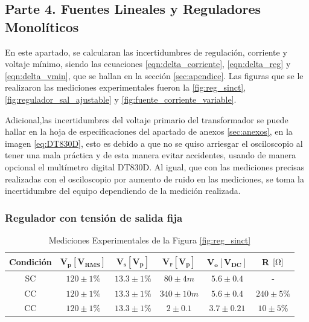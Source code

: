\subsection{Parte 4. Fuentes Lineales y Reguladores Monolíticos}\label{subsec:parte4}

    En este apartado, se calcularan las incertidumbres de regulación, corriente y voltaje mínimo, siendo las ecuaciones \ref{eqn:delta_corriente}, \ref{eqn:delta_reg} y \ref{eqn:delta_vmin}, que se hallan en la sección \ref{sec:apendice}. Las figuras que se le realizaron las mediciones experimentales fueron la \ref{fig:reg_sinct}, \ref{fig:regulador_sal_ajustable} y \ref{fig:fuente_corriente_variable}.

    Adicional,las incertidumbres del voltaje primario del transformador se puede hallar en la hoja de especificaciones del apartado de anexos \ref{sec:anexos}, en la imagen \ref{eq:DT830D}, esto es debido a que no se quiso arriesgar el osciloscopio al tener una mala práctica y de esta manera evitar accidentes, usando de manera opcional el multímetro digital DT830D. Al igual, que con las mediciones precisas realizadas con el osciloscopio por aumento de ruido en las mediciones, se toma la incertidumbre del equipo dependiendo de la medición realizada.

    \subsubsection{Regulador con tensión de salida fija}

        \begin{table}[H]
          \centering
          \begin{tabular}{|c|c|c|c|c|c|}
            \hline
            \textbf{Condición} & $\mathbf{V_p [V_{RMS}]}$ & $\mathbf{V_s [V_p]}$ & $\mathbf{V_r [V_p]}$ & $\mathbf{V_o [V_{DC}]}$ & \textbf{R} $\mathbf{[\ohm]}$ \\
            \hline
            SC & $120 \pm 1\%$ & $13.3 \pm 1\%$ & $80 \pm 4 m$ & $5.6 \pm 0.4$ & -  \\
            \hline
            CC & $120 \pm 1\%$ & $13.3 \pm 1\%$ & $340 \pm 10 m$ & $5.6 \pm 0.4$ & $240 \pm 5\%$ \\
            \hline
            CC & $120 \pm 1\%$ & $13.3 \pm 1\%$ & $2 \pm 0.1$ & $3.7 \pm 0.21$ & $10 \pm 5\%$  \\
            \hline
          \end{tabular}
          \caption{Mediciones Experimentales de la Figura \ref{fig:reg_sinct}}
          \label{exp_reg_sinct}
        \end{table}




